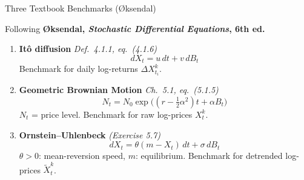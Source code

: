 \documentclass[aspectratio=169,10pt]{beamer}
\begin{document}
\begin{frame}{Three Textbook Benchmarks ({\O}ksendal)}

\small
Following \textbf{{\O}ksendal, \textit{Stochastic Differential Equations}, 6th ed.}

\medskip
\begin{enumerate}
  \setlength{\itemsep}{5pt}

  \item \textbf{It\^{o} diffusion} \hfill \textit{Def.\ 4.1.1, eq.\ (4.1.6)}
        \[ dX_t = u\,dt + v\,dB_t \]
        \vspace{-3pt}
        Benchmark for daily log-returns $\Delta X_{t_i}^k$.

  \item \textbf{Geometric Brownian Motion} \hfill \textit{Ch.\ 5.1, eq.\ (5.1.5)}
        \[ N_t = N_0\exp\!\bigl((r-\tfrac{1}{2}\alpha^2)t + \alpha B_t\bigr) \]
        \vspace{-3pt}
        $N_t$ = price level. Benchmark for raw log-prices $X_t^k$.

  \item \textbf{Ornstein--Uhlenbeck} \quad\textit{(Exercise 5.7)}
        \[ dX_t = \theta(m - X_t)\,dt + \sigma\,dB_t \]
        \vspace{-3pt}
        $\theta>0$: mean-reversion speed, $m$: equilibrium.
        Benchmark for detrended log-prices $\widetilde{X}_t^k$.
\end{enumerate}

\end{frame}
\end{document}
